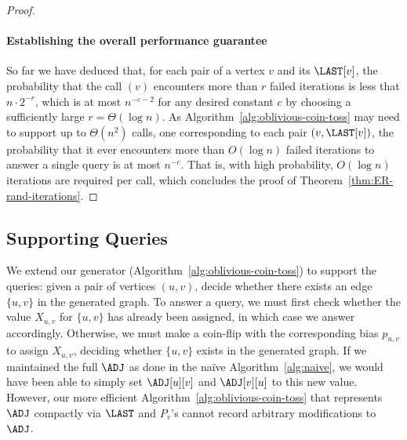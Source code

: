 \begin{proof}
\paragraph*{Establishing the overall performance guarantee}
So far we have deduced that, for each pair of a vertex $v$ and its $\LAST[v]$, the probability that the call $(v)$ encounters more than $r$ failed iterations is less that $n \cdot 2^{-r}$, which is at most $n^{-c-2}$ for any desired constant $c$ by choosing a sufficiently large $r = \Theta(\log n)$. As Algorithm~\ref{alg:oblivious-coin-toss} may need to support up to $\Theta(n^2)$  calls, one corresponding to each pair $(v, \LAST[v])$, the probability that it ever encounters more than $O(\log n)$  failed iterations to answer a single  query is at most $n^{-c}$. That is, with high probability, $O(\log n)$ iterations are required per  call, which concludes the proof of Theorem~\ref{thm:ER-rand-iterations}.
\end{proof}

\subsection{Supporting  Queries} \label{sec:ER-pair}

We extend our generator (Algorithm~\ref{alg:oblivious-coin-toss}) to support the  queries: given a pair of vertices $(u, v)$, decide whether there exists an edge $\{u, v\}$ in the generated graph. To answer a  query, we must first check whether the value $X_{u,v}$ for $\{u, v\}$ has already been assigned, in which case we answer accordingly. Otherwise, we must make a coin-flip with the corresponding bias $p_{u,v}$ to assign $X_{u,v}$, deciding whether $\{u, v\}$ exists in the generated graph. If we maintained the full $\ADJ$ as done in the na\"{i}ve Algorithm~\ref{alg:naive}, we would have been able to simply set $\ADJ[u][v]$ and $\ADJ[v][u]$ to this new value. However, our more efficient Algorithm~\ref{alg:oblivious-coin-toss} that represents $\ADJ$ compactly via $\LAST$ and $P_v$'s cannot record arbitrary modifications to $\ADJ$.

